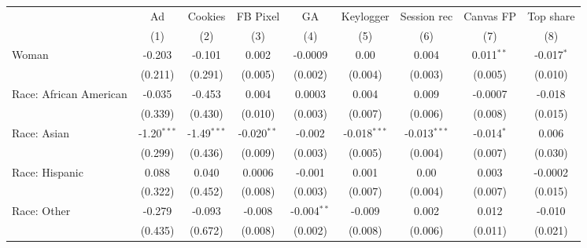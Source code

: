 
\begingroup
\centering
\begin{adjustbox}{width = \textwidth, center}
   \begin{tabular}{lcccccccc}
      \toprule
                              & Ad            & Cookies       & FB Pixel      & GA            & Keylogger              & Session rec            & Canvas FP     & Top share \\   
                              & (1)           & (2)           & (3)           & (4)           & (5)                    & (6)                    & (7)           & (8)\\  
      \midrule 
      Woman                   & -0.203        & -0.101        & 0.002         & -0.0009       & $0.00$  & 0.004                  & 0.011$^{**}$  & -0.017$^{*}$\\   
                              & (0.211)       & (0.291)       & (0.005)       & (0.002)       & (0.004)                & (0.003)                & (0.005)       & (0.010)\\   
      Race: African American  & -0.035        & -0.453        & 0.004         & 0.0003        & 0.004                  & 0.009                  & -0.0007       & -0.018\\   
                              & (0.339)       & (0.430)       & (0.010)       & (0.003)       & (0.007)                & (0.006)                & (0.008)       & (0.015)\\   
      Race: Asian             & -1.20$^{***}$ & -1.49$^{***}$ & -0.020$^{**}$ & -0.002        & -0.018$^{***}$         & -0.013$^{***}$         & -0.014$^{*}$  & 0.006\\   
                              & (0.299)       & (0.436)       & (0.009)       & (0.003)       & (0.005)                & (0.004)                & (0.007)       & (0.030)\\   
      Race: Hispanic          & 0.088         & 0.040         & 0.0006        & -0.001        & 0.001                  & $0.00$  & 0.003         & -0.0002\\   
                              & (0.322)       & (0.452)       & (0.008)       & (0.003)       & (0.007)                & (0.004)                & (0.007)       & (0.015)\\   
      Race: Other             & -0.279        & -0.093        & -0.008        & -0.004$^{**}$ & -0.009                 & 0.002                  & 0.012         & -0.010\\   
                              & (0.435)       & (0.672)       & (0.008)       & (0.002)       & (0.008)                & (0.006)                & (0.011)       & (0.021)\\   

\end{tabular}
\end{adjustbox}
